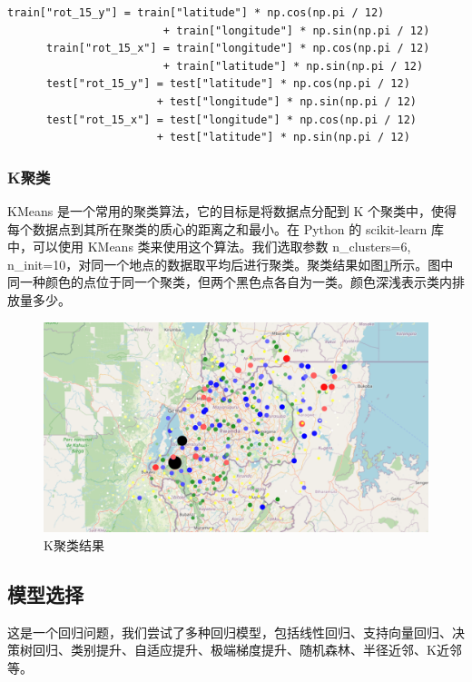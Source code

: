 \documentclass{ctexart}
\begin{document}
\begin{lstlisting}[style=Python]
      train["rot_15_y"] = train["latitude"] * np.cos(np.pi / 12) 
                        + train["longitude"] * np.sin(np.pi / 12)
      train["rot_15_x"] = train["longitude"] * np.cos(np.pi / 12) 
                        + train["latitude"] * np.sin(np.pi / 12)
      test["rot_15_y"] = test["latitude"] * np.cos(np.pi / 12) 
                       + test["longitude"] * np.sin(np.pi / 12)
      test["rot_15_x"] = test["longitude"] * np.cos(np.pi / 12) 
                       + test["latitude"] * np.sin(np.pi / 12)
\end{lstlisting}

\subsubsection{K聚类}

KMeans 是一个常用的聚类算法，它的目标是将数据点分配到 K 个聚类中，使得每个数据点到其所在聚类的质心的距离之和最小。在 Python 的 scikit-learn 库中，可以使用 KMeans 类来使用这个算法。我们选取参数 n\_clusters=6, n\_init=10，对同一个地点的数据取平均后进行聚类。聚类结果如图\ref{fig:10}所示。图中同一种颜色的点位于同一个聚类，但两个黑色点各自为一类。颜色深浅表示类内排放量多少。

\begin{figure}[H]
      \centering
      \includegraphics[width=1\textwidth]{output10.png}
      \caption{\label{fig:10}K聚类结果}
\end{figure}

\subsection{模型选择}

这是一个回归问题，我们尝试了多种回归模型，包括线性回归、支持向量回归、决策树回归、类别提升、自适应提升、极端梯度提升、随机森林、半径近邻、K近邻等。
\end{document}

